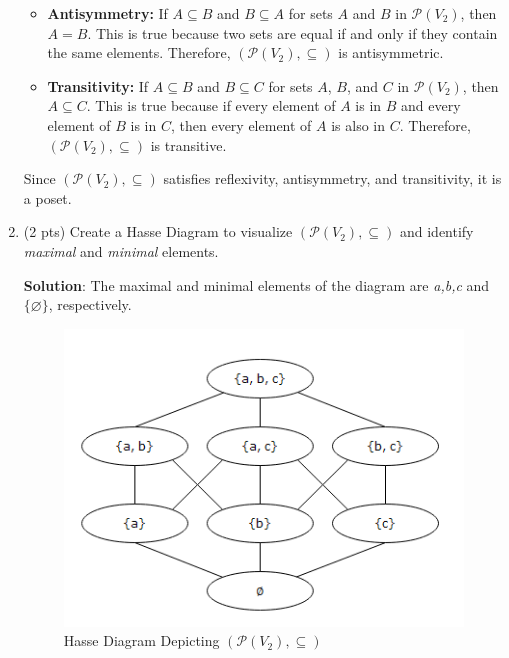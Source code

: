 \documentclass[12pt]{article}
\begin{document}
\begin{spacing}{1.5}
\begin{enumerate}
\begin{itemize}
		      	\item \textbf{Antisymmetry:}
		      	      If \( A \subseteq B \) and \( B \subseteq A \) for sets \( A \) and \( B \) in \( \mathcal{P}(V_2) \), then \( A = B \). This is true because two sets are equal if and only if they contain the same elements. Therefore, \( (\mathcal{P}(V_2),\subseteq) \) is antisymmetric.
		      	      		      	                  
		      	\item \textbf{Transitivity:}
		      	      If \( A \subseteq B \) and \( B \subseteq C \) for sets \( A \), \( B \), and \( C \) in \( \mathcal{P}(V_2) \), then \( A \subseteq C \). This is true because if every element of \( A \) is in \( B \) and every element of \( B \) is in \( C \), then every element of \( A \) is also in \( C \). Therefore, \( (\mathcal{P}(V_2),\subseteq) \) is transitive.
		      \end{itemize}
		      		              
		      Since \( (\mathcal{P}(V_2),\subseteq) \) satisfies reflexivity, antisymmetry, and transitivity, it is a poset.
		      		              
		\item (2 pts) Create a Hasse Diagram to visualize $(\mathcal{P}(V_2),\subseteq)$ and identify \textit{maximal} and \textit{minimal} elements.

            \textbf{Solution}: The maximal and minimal elements of the diagram are \textit{a,b,c} and $\{\varnothing\}$, respectively.
            
		      \begin{figure}[htp]
		      	\centering
		      	\includegraphics{static/HasseDiagram_6_2_3.png}
		      	\caption{Hasse Diagram Depicting $(\mathcal{P}(V_2),\subseteq)$}
		      	\label{fig:figure}
		      \end{figure}
		      		        

\end{enumerate}
\end{spacing}
\end{document}
